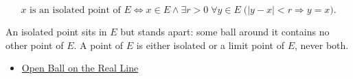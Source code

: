 \begin{remark*}
\[
x \text{ is an isolated point of } E
\Longleftrightarrow
x\in E \land \exists r>0\;\forall y\in E\;\bigl(|y-x|<r \Rightarrow y=x\bigr).
\]
\end{remark*}
\begin{remark*}[Interpretation]
An isolated point sits in $E$ but stands apart: some ball around it contains no other point of $E$. A point of $E$ is either isolated or a limit point of $E$, never both.
\end{remark*}
\begin{dependencies}
\begin{itemize}
  \item \hyperref[def:open-ball]{Open Ball on the Real Line}
\end{itemize}
\end{dependencies}
